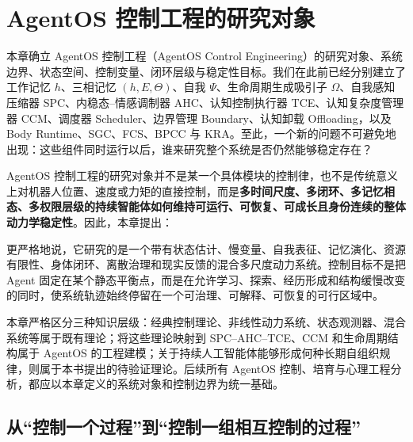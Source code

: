 \chapter{AgentOS 控制工程的研究对象}
\label{chap:agentos-control-engineering-object}

\begin{chapterlead}
本章确立 AgentOS 控制工程（AgentOS Control Engineering）的研究对象、系统边界、状态空间、控制变量、闭环层级与稳定性目标。我们在此前已经分别建立了工作记忆 $h$、三相记忆 $(h,E,\Theta)$、自我 $\Psi$、生命周期生成吸引子 $\Omega$、自我感知压缩器 SPC、内稳态--情感调制器 AHC、认知控制执行器 TCE、认知复杂度管理器 CCM、调度器 Scheduler、边界管理 Boundary、认知卸载 Offloading，以及 Body Runtime、SGC、FCS、BPCC 与 KRA。至此，一个新的问题不可避免地出现：这些组件同时运行以后，谁来研究整个系统是否仍然能够稳定存在？

AgentOS 控制工程的研究对象并不是某一个具体模块的控制律，也不是传统意义上对机器人位置、速度或力矩的直接控制，而是\textbf{多时间尺度、多闭环、多记忆相态、多权限层级的持续智能体如何维持可运行、可恢复、可成长且身份连续的整体动力学稳定性}。因此，本章提出：

\begin{statementbox}
\centering
{}
\end{statementbox}

更严格地说，它研究的是一个带有状态估计、慢变量、自我表征、记忆演化、资源有限性、身体闭环、离散治理和现实反馈的混合多尺度动力系统。控制目标不是把 Agent 固定在某个静态平衡点，而是在允许学习、探索、经历形成和结构缓慢改变的同时，使系统轨迹始终停留在一个可治理、可解释、可恢复的可行区域中。

本章严格区分三种知识层级：经典控制理论、非线性动力系统、状态观测器、混合系统等属于既有理论；将这些理论映射到 SPC--AHC--TCE、CCM 和生命周期结构属于 AgentOS 的工程建模；关于持续人工智能体能够形成何种长期自组织规律，则属于本书提出的待验证理论。后续所有 AgentOS 控制、培育与心理工程分析，都应以本章定义的系统对象和控制边界为统一基础。
\end{chapterlead}


\section{从“控制一个过程”到“控制一组相互控制的过程”}

